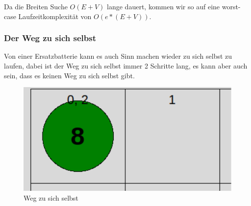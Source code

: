 \documentclass[a4paper,12pt,arial]{scrartcl}
\begin{document}
Da die Breiten Suche $O(E+V)$ lange dauert, kommen wir so auf eine worst-case Laufzeitkomplexität von $O(e * (E + V))$.

\subsubsection{Der Weg zu sich selbst}
Von einer Ersatzbatterie kann es auch Sinn machen wieder zu sich selbst zu laufen,
dabei ist der Weg zu sich selbst immer 2 Schritte lang, es kann aber auch sein, dass es keinen Weg zu sich selbst gibt.
\begin{figure}[h]
    \centering
    \includegraphics[width=\textwidth]{way_to_self.pdf}
    \caption{Weg zu sich selbst}
    \label{fig:way_to_self}
\end{figure}

\newpage
\end{document}
